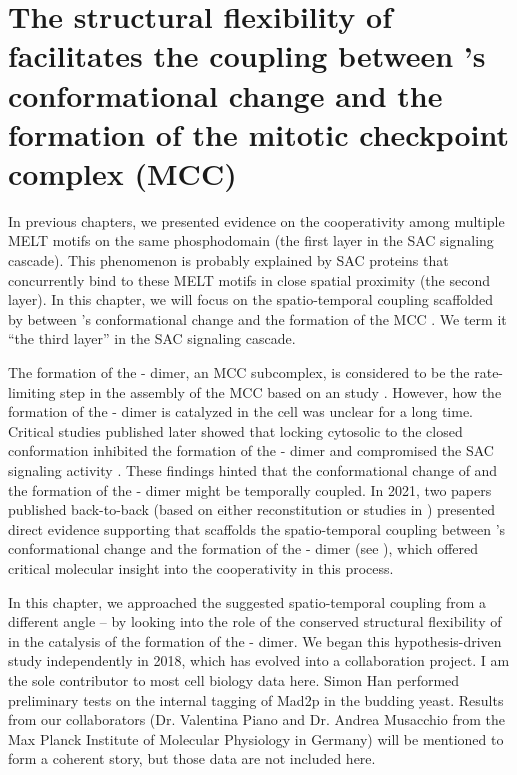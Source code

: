 \chapter{The structural flexibility of  facilitates the coupling between 's conformational change and the formation of the mitotic checkpoint complex (MCC)}
\label{chpt:4}

In previous chapters, we presented evidence on the cooperativity among multiple MELT motifs on the same  phosphodomain (the first layer in the SAC signaling cascade). This phenomenon is probably explained by SAC proteins that concurrently bind to these MELT motifs in close spatial proximity (the second layer). In this chapter, we will focus on the spatio-temporal coupling scaffolded by  between 's conformational change and the formation of the MCC \cite{BUB1-CDC20-MAD1,Tripartite}. We term it ``the third layer'' in the SAC signaling cascade. %

The formation of the - dimer, an MCC subcomplex, is considered to be the rate-limiting step in the assembly of the MCC based on an  study \cite{Faesen2017}. However, how the formation of the - dimer is catalyzed in the cell was unclear for a long time. Critical studies published later showed that locking cytosolic  to the closed conformation inhibited the formation of the - dimer and compromised the SAC signaling activity \cite{Ma+Poon2016,Ma+Poon2018,Kim2018}. These findings hinted that the conformational change of  and the formation of the - dimer might be temporally coupled. In 2021, two papers published back-to-back (based on either  reconstitution \cite{BUB1-CDC20-MAD1} or studies in  \cite{Tripartite}) presented direct evidence supporting that  scaffolds the spatio-temporal coupling between 's conformational change and the formation of the - dimer (see ), which offered critical molecular insight into the cooperativity in this process.

In this chapter, we approached the suggested spatio-temporal coupling from a different angle -- by looking into the role of the conserved structural flexibility of  in the catalysis of the formation of the - dimer. We began this hypothesis-driven study independently in 2018, which has evolved into a collaboration project. I am the sole contributor to most cell biology data here. Simon Han performed preliminary tests on the internal tagging of Mad2p in the budding yeast. Results from our collaborators (Dr. Valentina Piano and Dr. Andrea Musacchio from the Max Planck Institute of Molecular Physiology in Germany) will be mentioned to form a coherent story, but those data are not included here.

